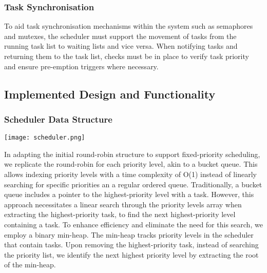 \subsubsection{Task Synchronisation}
To aid task synchronisation mechanisms within the system such as semaphores and mutexes, the scheduler must support the movement of tasks from the running task list to waiting lists and vice versa. When notifying tasks and returning them to the task list, checks must be in place to verify task priority and ensure pre-emption triggers where necessary.

\subsection{Implemented Design and Functionality}
\subsubsection{Scheduler Data Structure}
\begin{center}
	\texttt{[image: scheduler.png]}
\end{center}
In adapting the initial round-robin structure to support fixed-priority scheduling, we replicate the round-robin for each priority level, akin to a bucket queue. This allows indexing priority levels with a time complexity of O(1) instead of linearly searching for specific priorities an a regular ordered queue. Traditionally, a bucket queue includes a pointer to the highest-priority level with a task. However, this approach necessitates a linear search through the priority levels array when extracting the highest-priority task, to find the next highest-priority level containing a task. \hfill\newline
To enhance efficiency and eliminate the need for this search, we employ a binary min-heap. The min-heap tracks priority levels in the scheduler that contain tasks. Upon removing the highest-priority task, instead of searching the priority list, we identify the next highest priority level by extracting the root of the min-heap.

